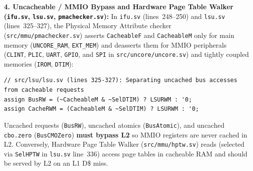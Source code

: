 \documentclass[11pt,a4paper]{article}
\begin{document}
\textbf{4. Uncacheable / MMIO Bypass and Hardware Page Table Walker (\texttt{ifu.sv}, \texttt{lsu.sv}, \texttt{pmachecker.sv}):}
In \texttt{ifu.sv} (lines~248--250) and \texttt{lsu.sv} (lines~325--327), the Physical Memory Attribute checker (\texttt{src/\allowbreak mmu/\allowbreak pmachecker.sv}) asserts \texttt{CacheableF} and \texttt{CacheableM} only for main memory (\texttt{UNCORE\_RAM}, \texttt{EXT\_MEM}) and deasserts them for MMIO peripherals (\texttt{CLINT}, \texttt{PLIC}, \texttt{UART}, \texttt{GPIO}, and \texttt{SPI} in \texttt{src/\allowbreak uncore/\allowbreak uncore.sv}) and tightly coupled memories (\texttt{IROM}, \texttt{DTIM}):
\begin{lstlisting}[style=verilogstyle]
// src/lsu/lsu.sv (lines 325-327): Separating uncached bus accesses from cacheable requests
assign BusRW = (~CacheableM & ~SelDTIM) ? LSURWM : '0;
assign CacheRWM = (CacheableM & ~SelDTIM) ? LSURWM : '0;
\end{lstlisting}
Uncached requests (\texttt{BusRW}), uncached atomics (\texttt{BusAtomic}), and uncached \texttt{cbo.zero} (\texttt{BusCMOZero}) \textbf{must bypass L2} so MMIO registers are never cached in L2. Conversely, Hardware Page Table Walker (\texttt{src/mmu/hptw.sv}) reads (selected via \texttt{SelHPTW} in \texttt{lsu.sv} line~336) access page tables in cacheable RAM and should be served by L2 on an L1 D\$ miss.
\end{document}
